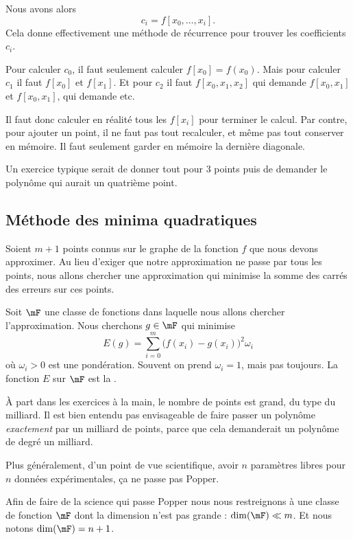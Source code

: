 Nous avons alors
\begin{equation}
    c_i=f[x_0,\ldots, x_i].
\end{equation}
Cela donne effectivement une méthode de récurrence pour trouver les coefficients \( c_i\).

\begin{remark}
    Pour calculer \( c_0\), il faut seulement calculer \( f[x_0]=f(x_0)\). Mais pour calculer \( c_1\) il faut \( f[x_0] \) et \( f[x_1]\). Et pour \( c_2\) il faut \( f[x_0,x_1,x_2]\) qui demande \( f[x_0,x_1]\) et \( f[x_0,x_1]\), qui demande etc.

    Il faut donc calculer en réalité tous les \( f[x_i]\) pour terminer le calcul. Par contre, pour ajouter un point, il ne faut pas tout recalculer, et même pas tout conserver en mémoire. Il faut seulement garder en mémoire la dernière diagonale.
\end{remark}


Un exercice typique serait de donner tout pour \( 3\) points puis de demander le polynôme qui aurait un quatrième point.

\subsection{Méthode des minima quadratiques}

Soient \( m+1\) points connus sur le graphe de la fonction \( f\) que nous devons approximer. Au lieu d'exiger que notre approximation ne passe par tous les points, nous allons chercher une approximation qui minimise la somme des carrés des erreurs sur ces points.

Soit \( \mF\) une classe de fonctions dans laquelle nous allons chercher l'approximation. Nous cherchons \( g\in \mF\) qui minimise
\begin{equation}    \label{EQooJGQVooKwZZVJ}
   E(g)= \sum_{i=0}^m \big( f(x_i)-g(x_i) \big)^2\omega_i
\end{equation}
où \( \omega_i>0\) est une pondération. Souvent on prend \( \omega_i=1\), mais pas toujours. La fonction \( E\) sur \( \mF\) est la .

\begin{normaltext}
    À part dans les exercices à la main, le nombre de points est grand, du type du milliard. Il est bien entendu pas envisageable de faire passer un polynôme \emph{exactement} par un milliard de points, parce que cela demanderait un polynôme de degré un milliard. 

    Plus généralement, d'un point de vue scientifique, avoir \( n\) paramètres libres pour \( n\) données expérimentales, ça ne passe pas Popper.

    Afin de faire de la science qui passe Popper nous nous restreignons à une classe de fonction \( \mF\) dont la dimension n'est pas grande : \( \dim( \mF)\ll m\). Et nous notons \( \dim(\mF)=n+1\).
\end{normaltext}

